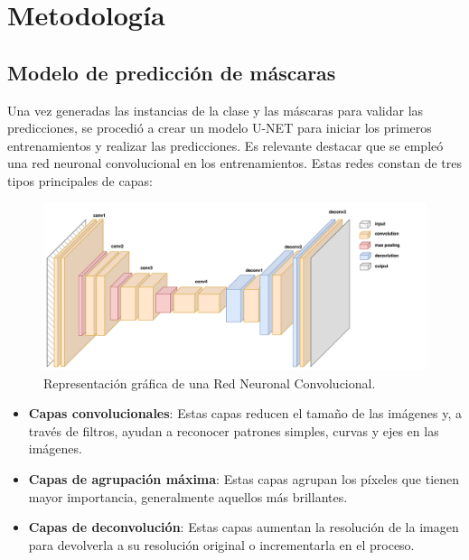 \documentclass[runningheads]{llncs}
\begin{document}
\section{Metodología}

\subsection{Modelo de predicción de máscaras}

Una vez generadas las instancias de la clase y las máscaras para validar las predicciones, se procedió a crear un modelo U-NET para iniciar los primeros entrenamientos y realizar las predicciones. Es relevante destacar que se empleó una red neuronal convolucional en los entrenamientos. Estas redes constan de tres tipos principales de capas:

\begin{figure}
    \centering
    \includegraphics[scale=0.2]{images/red.png}
    \caption{Representación gráfica de una Red Neuronal Convolucional.}\label{fig:imagen1}
\end{figure}

\begin{itemize}
    \begin{itemize}
        \item \textbf{Capas convolucionales}: Estas capas reducen el tamaño de las imágenes y, a través de filtros, ayudan a reconocer patrones simples, curvas y ejes en las imágenes.
        \item \textbf{Capas de agrupación máxima}: Estas capas agrupan los píxeles que tienen mayor importancia, generalmente aquellos más brillantes.
        \item \textbf{Capas de deconvolución}: Estas capas aumentan la resolución de la imagen para devolverla a su resolución original o incrementarla en el proceso.
    \end{itemize}
\end{itemize}
\end{document}
